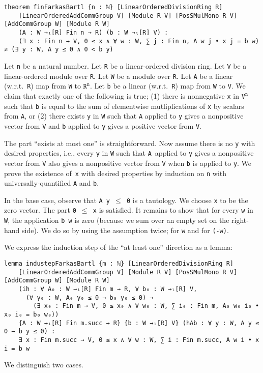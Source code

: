 \documentclass[]{article}
\begin{document}
\begin{lstlisting}
theorem finFarkasBartl {n : ℕ} [LinearOrderedDivisionRing R]
    [LinearOrderedAddCommGroup V] [Module R V] [PosSMulMono R V] [AddCommGroup W] [Module R W]
    (A : W →ₗ[R] Fin n → R) (b : W →ₗ[R] V) :
    (∃ x : Fin n → V, 0 ≤ x ∧ ∀ w : W, ∑ j : Fin n, A w j • x j = b w) ≠ (∃ y : W, A y ≤ 0 ∧ 0 < b y)
\end{lstlisting}
Let \texttt{n} be a natural number.
Let \texttt{R} be a linear-ordered division ring.
Let \texttt{V} be a linear-ordered module over \texttt{R}.
Let \texttt{W} be a module over \texttt{R}.
Let \texttt{A} be a linear (w.r.t.~\texttt{R}) map from \texttt{W} to $\texttt{R}^{\texttt{n}}$.
Let \texttt{b} be a linear (w.r.t.~\texttt{R}) map from \texttt{W} to \texttt{V}.
We claim that exactly one of the following is true;
(1) there is nonnegative \texttt{x} in $\texttt{V}^{\texttt{n}}$ such that \texttt{b} is equal to
the sum of elementwise mutliplications of \texttt{x} by scalars from \texttt{A}, or
(2) there exists \texttt{y} in \texttt{W} such that \texttt{A} applied to \texttt{y}
gives a nonpositive vector from \texttt{V} and \texttt{b} applied to \texttt{y} gives
a positive vector from \texttt{V}.

The part ``exists at most one'' is straightforward.
Now assume there is no \texttt{y} with desired properties, i.e.,
every \texttt{y} in \texttt{W} such that \texttt{A}~applied to \texttt{y}
gives a nonpositive vector from \texttt{V} also gives a nonpositive vector from \texttt{V}
when \texttt{b} is applied to \texttt{y}.
We prove the existence of~\texttt{x} with desired properties by induction on \texttt{n}
with universally-quantified \texttt{A} and \texttt{b}.

In the base case, observe that \texttt{A y $\le$ 0} is a tautology.
We choose \texttt{x} to be the zero vector. The part \texttt{0 $\le$ x} is satisfied.
It remains to show that for every \texttt{w} in \texttt{W}, the application \texttt{b w}
is zero (because we sum over an empty set on the right-hand side).
We do so by using the assumption twice; for \texttt{w} and for \texttt{(-w)}.

We express the induction step of the ``at least one'' direction as a lemma:
\begin{lstlisting}
lemma industepFarkasBartl {m : ℕ} [LinearOrderedDivisionRing R]
    [LinearOrderedAddCommGroup V] [Module R V] [PosSMulMono R V] [AddCommGroup W] [Module R W]
    (ih : ∀ A₀ : W →ₗ[R] Fin m → R, ∀ b₀ : W →ₗ[R] V,
      (∀ y₀ : W, A₀ y₀ ≤ 0 → b₀ y₀ ≤ 0) →
        (∃ x₀ : Fin m → V, 0 ≤ x₀ ∧ ∀ w₀ : W, ∑ i₀ : Fin m, A₀ w₀ i₀ • x₀ i₀ = b₀ w₀))
    {A : W →ₗ[R] Fin m.succ → R} {b : W →ₗ[R] V} (hAb : ∀ y : W, A y ≤ 0 → b y ≤ 0) :
    ∃ x : Fin m.succ → V, 0 ≤ x ∧ ∀ w : W, ∑ i : Fin m.succ, A w i • x i = b w
\end{lstlisting}
We distinguish two cases.
\end{document}
